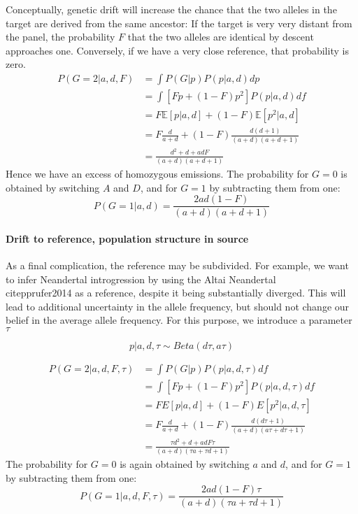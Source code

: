 \documentclass[10pt,a4paper]{article}
\newcommand{\BE}[1]{\mathbb{E}\left[#1\right]}
\begin{document}
Conceptually, genetic drift will increase the chance that the two alleles in the target are derived from the same ancestor: If the target is very very distant from the panel, the probability $F$ that the two alleles are identical by descent approaches one.  Conversely, if we have a very close reference, that probability is zero. 
\begin{align}
P(G=2 | a,d, F) &= \int P(G|p) P(p | a, d) dp \nonumber\\
&= \int \left[ F p + (1-F) p^2\right] P(p | a, d) df\nonumber\\
&= F \BE{p|a, d} + (1-F)  \BE{p^2|a, d}\nonumber\\
&= F \frac{d}{a+d} + (1-F)  \frac{d (d+1)}{(a+d)(a+d+1)}\nonumber\\
&= \frac{d^2 + d + adF}{(a+d)(a+d+1)}
\end{align}
Hence we have an excess of homozygous emissions. The probability for $G=0$ is obtained by switching $A$ and $D$, and for $G=1$ by subtracting them from one:
\begin{equation}
P(G=1 | a,d) = \frac{2ad(1-F)}{(a+d)(a+d+1)}
\end{equation} 

\paragraph{Drift to reference, population structure in source}
As a final complication, the reference may be subdivided. For example, we want to infer Neandertal introgression by using the Altai Neandertal \\citep{prufer2014} as a reference, despite it being substantially diverged. This will lead to additional uncertainty in the allele frequency, but should not change our belief in the average allele frequency. For this purpose, we introduce a parameter $\tau$

\begin{equation}
p| a, d, \tau \sim Beta (d\tau, a\tau)
\end{equation}



\begin{align}
P(G=2 | a,d, F, \tau) &= \int P(G|p) P(p | a, d, \tau) df\nonumber\\
&= \int \left[ F p + (1-F) p^2\right] P(p | a, d, \tau) df\nonumber\\
&= F E[p|a,d] + (1-F)  E[p^2|a, d, \tau]\nonumber\\
&= F \frac{d}{a+d} + (1-F)  \frac{d (d\tau+1)}{(a+d)(a\tau+d\tau+1)}\nonumber\\
&= \frac{\tau d^2 + d + adF\tau}{(a+d)(\tau a+\tau d+1)}
\end{align}
The probability for $G=0$ is again obtained by switching $a$ and $d$, and for $G=1$ by subtracting them from one:
\begin{equation}
P(G=1 | a,d, F, \tau) = \frac{2ad(1-F)\tau}{(a+d)(\tau a+\tau d+1)}
\end{equation} 
\end{document}
